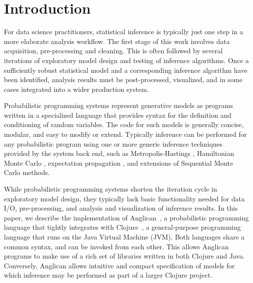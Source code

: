 \documentclass[sigconf]{acmart}
\begin{document}
\maketitle

\section{Introduction}
\label{sec:intro}

For data science practitioners, statistical inference is typically
just one step in a more elaborate analysis workflow. The first stage
of this work involves data acquisition, pre-processing and cleaning.
This is often followed by several iterations of exploratory model
design and testing of inference algorithms. Once a sufficiently
robust statistical model and a corresponding inference algorithm have
been identified, analysis results must be post-processed, visualized,
and in some cases integrated into a wider production system.

Probabilistic programming systems \cite{GMR+08,MSP14,WVM14,GS15}
represent generative models as programs written in a specialized
language that provides syntax for the definition and conditioning of
random variables. The code for such models is generally concise,
modular, and easy to modify or extend. Typically inference can be
performed for any probabilistic program using one or more generic
inference techniques provided by the system back end, such as
Metropolis-Hastings \cite{WSG11,MSP14,YHG14}, Hamiltonian Monte Carlo
\cite{SDT14}, expectation propagation \cite{MWG+10}, and extensions
of Sequential Monte Carlo \cite{WVM14,MYM+15,PWD+14} methods.

While probabilistic programming systems shorten the iteration cycle in
exploratory model design, they typically lack basic functionality needed for
data I/O, pre-processing, and analysis and visualization of inference results.
In this paper, we describe the implementation of
Anglican~\cite{TMW15, Anglican}, a probabilistic
programming language that tightly integrates with
Clojure~\cite{H08}, a general-purpose programming language
that runs on the Java Virtual Machine (JVM). Both languages share a common
syntax, and can be invoked from each other. This allows Anglican programs to
make use of a rich set of libraries written in both Clojure and Java.
Conversely, Anglican allows intuitive and compact specification of models for
which inference may be performed as part of a larger Clojure project.
\end{document}
